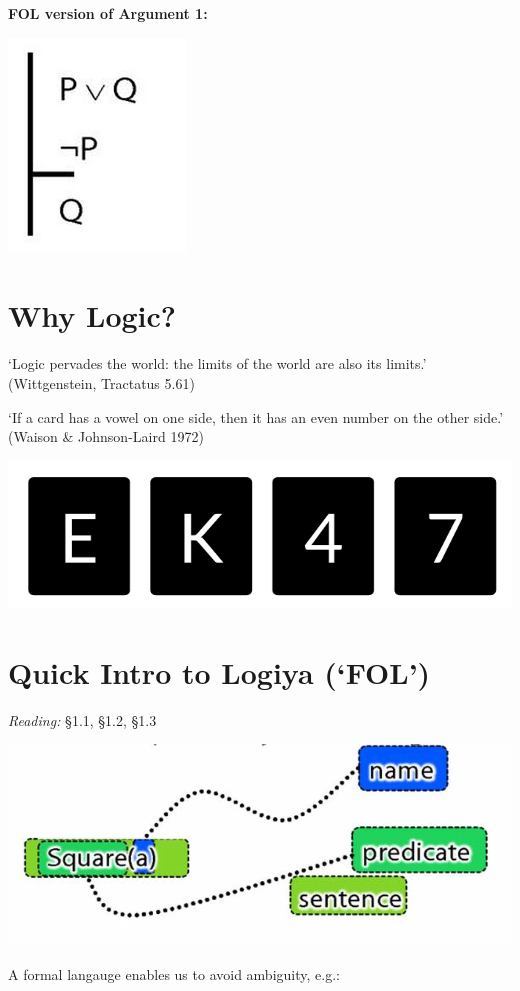 \documentclass[12pt]{extarticle}
\begin{document}
\begin{multicols*}{3}
\begin{minipage}{\columnwidth}
\textbf{FOL version of Argument 1:}
 
\begin{center}
\includegraphics[scale=0.3]{img/argument1_fol.png}
\end{center}
\end{minipage}
 
 
 
\section{Why Logic?}
 
‘Logic pervades the world: the limits of the world are also its limits.’
(Wittgenstein, Tractatus 5.61)
 
‘If a card has a vowel on one side, then it has an even number on the other side.’
(Waison \& Johnson-Laird 1972)
 
\begin{center}
\includegraphics[scale=0.3]{img/waison_fig.png}
\end{center}
 
 
\section{Quick Intro to Logiya (‘FOL’)}
 
\emph{Reading:} §1.1, §1.2, §1.3
 
\begin{center}
\includegraphics[scale=0.3]{img/name_predicate_sentence.png}
\end{center}
A formal langauge enables us to avoid ambiguity, e.g.:
 

\end{multicols*}
\end{document}
